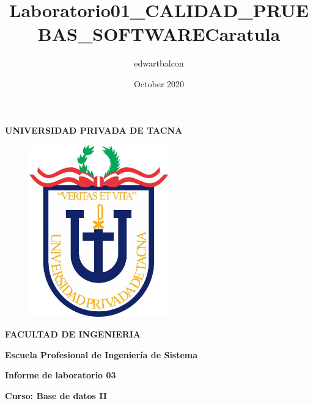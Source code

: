 \documentclass{article}
\title{Laboratorio01_CALIDAD_PRUEBAS_SOFTWARE}
\author{edwartbalcon }
\date{October 2020}
\begin{document}
\title{Caratula}

\begin{titlepage}
\begin{center}
\begin{Large}
\textbf{UNIVERSIDAD PRIVADA DE TACNA} \\
\end{Large}
\vspace*{-0.025in}
\begin{figure}[htb]
\begin{center}
\includegraphics[width=6cm]{./images/logo_UPT}
\end{center}
\end{figure}
\vspace*{-0.025in}
\begin{Large}
\textbf{FACULTAD DE INGENIERIA} \\
\end{Large}
\vspace*{0.05in}
\begin{Large}
\textbf{Escuela Profesional de Ingeniería de Sistema} \\
\end{Large}


\vspace*{0.4in}

\vspace*{0.1in}
\begin{Large}
\textbf{Informe de laboratorio 03} \\
\end{Large}

\vspace*{0.3in}
\begin{Large}
\textbf{Curso: Base de datos II} \\
\end{Large}


\end{center}
\end{titlepage}
\end{document}
